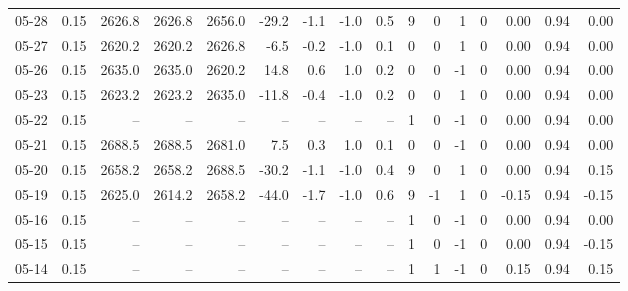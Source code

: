\begin{threeparttable}
{\begin{tabular}{lrrrrrrrrrrrrrrr}
  05-28 &     0.15 & 2626.8 & 2626.8 & 2656.0 &      -29.2 &           -1.1 &                     -1.0 &                 0.5 &              9 &         0 &     1 &         0 &       0.00 &      0.94 &           0.00 \\
  05-27 &     0.15 & 2620.2 & 2620.2 & 2626.8 &       -6.5 &           -0.2 &                     -1.0 &                 0.1 &              0 &         0 &     1 &         0 &       0.00 &      0.94 &           0.00 \\
  05-26 &     0.15 & 2635.0 & 2635.0 & 2620.2 &       14.8 &            0.6 &                      1.0 &                 0.2 &              0 &         0 &    -1 &         0 &       0.00 &      0.94 &           0.00 \\
  05-23 &     0.15 & 2623.2 & 2623.2 & 2635.0 &      -11.8 &           -0.4 &                     -1.0 &                 0.2 &              0 &         0 &     1 &         0 &       0.00 &      0.94 &           0.00 \\
  05-22 &     0.15 &     -- &     -- &     -- &         -- &             -- &                       -- &                  -- &              1 &         0 &    -1 &         0 &       0.00 &      0.94 &           0.00 \\
  05-21 &     0.15 & 2688.5 & 2688.5 & 2681.0 &        7.5 &            0.3 &                      1.0 &                 0.1 &              0 &         0 &    -1 &         0 &       0.00 &      0.94 &           0.00 \\
  05-20 &     0.15 & 2658.2 & 2658.2 & 2688.5 &      -30.2 &           -1.1 &                     -1.0 &                 0.4 &              9 &         0 &     1 &         0 &       0.00 &      0.94 &           0.15 \\
  05-19 &     0.15 & 2625.0 & 2614.2 & 2658.2 &      -44.0 &           -1.7 &                     -1.0 &                 0.6 &              9 &        -1 &     1 &         0 &      -0.15 &      0.94 &          -0.15 \\
  05-16 &     0.15 &     -- &     -- &     -- &         -- &             -- &                       -- &                  -- &              1 &         0 &    -1 &         0 &       0.00 &      0.94 &           0.00 \\
  05-15 &     0.15 &     -- &     -- &     -- &         -- &             -- &                       -- &                  -- &              1 &         0 &    -1 &         0 &       0.00 &      0.94 &          -0.15 \\
  05-14 &     0.15 &     -- &     -- &     -- &         -- &             -- &                       -- &                  -- &              1 &         1 &    -1 &         0 &       0.15 &      0.94 &           0.15 \\

\end{tabular}}
\end{threeparttable}
